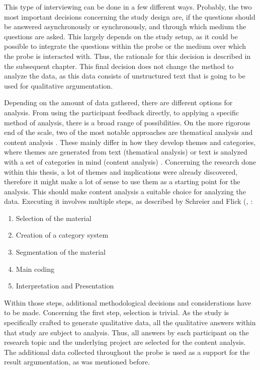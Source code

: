 This type of interviewing can be done in a few different ways. Probably, the two most important decisions concerning the study design are, if the questions should be answered asynchronously or synchronously, and through which medium the questions are asked. This largely depends on the study setup, as it could be possible to integrate the questions within the probe or the medium over which the probe is interacted with. Thus, the rationale for this decision is described in the subsequent chapter. This final decision does not change the method to analyze the data, as this data consists of unstructured text that is going to be used for qualitative argumentation.

Depending on the amount of data gathered, there are different options for analysis. From using the participant feedback directly, to applying a specific method of analysis, there is a broad range of possibilities. On the more rigorous end of the scale, two of the most notable approaches are thematical analysis \cite{braun2006using} and content analysis \cite{schreier2012qualitative}. These mainly differ in how they develop themes and categories, where themes are generated from text (thematical analysis) or text is analyzed with a set of categories in mind (content analysis) \cite[p. 490]{flick2018introduction}. Concerning the research done within this thesis, a lot of themes and implications were already discovered, therefore it might make a lot of sense to use them as a starting point for the analysis. This should make content analysis a suitable choice for analyzing the data. Executing it involves multiple steps, as described by Schreier and Flick (\cite[p. 174]{schreier2014ways}, \cite[p. 483-485]{flick2018introduction}:

\begin{enumerate}
  \item{Selection of the material}
  \item{Creation of a category system}
  \item{Segmentation of the material}
  \item{Main coding}
  \item{Interpretation and Presentation}
\end{enumerate}

Within those steps, additional methodological decisions and considerations have to be made. Concerning the first step, selection is trivial. As the study is specifically crafted to generate qualitative data, all the qualitative answers within that study are subject to analysis. Thus, all answers by each participant on the research topic and the underlying project are selected for the content analysis. The additional data collected throughout the probe is used as a support for the result argumentation, as was mentioned before.

